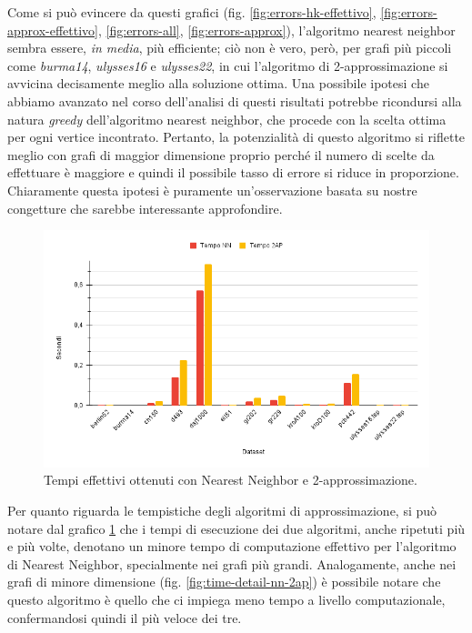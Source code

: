 Come si può evincere da questi grafici (fig. \ref{fig:errors-hk-effettivo}, \ref{fig:errors-approx-effettivo}, \ref{fig:errors-all}, \ref{fig:errors-approx}), l'algoritmo nearest neighbor sembra essere, \textit{in media}, più efficiente; ciò non è vero, però, per grafi più piccoli come \textit{burma14}, \textit{ulysses16} e \textit{ulysses22}, in cui l'algoritmo di 2-approssimazione si avvicina decisamente meglio alla soluzione ottima. 
Una possibile ipotesi che abbiamo avanzato nel corso dell'analisi di questi risultati potrebbe ricondursi alla natura \textit{greedy} dell'algoritmo nearest neighbor, che procede con la scelta ottima per ogni vertice incontrato. Pertanto, la potenzialità di questo algoritmo si riflette meglio con grafi di maggior dimensione proprio perché il numero di scelte da effettuare è maggiore e quindi il possibile tasso di errore si riduce in proporzione. Chiaramente questa ipotesi è puramente un'osservazione basata su nostre congetture che sarebbe interessante approfondire. 


\begin{figure}[H]
	\centering
	\includegraphics[width=1\textwidth]{res/images/time/time-nn-2ap.png}
	\caption{Tempi effettivi ottenuti con Nearest Neighbor e 2-approssimazione.}
	\label{fig:time-nn-2ap}
\end{figure}

Per quanto riguarda le tempistiche degli algoritmi di approssimazione, si può notare dal grafico \ref{fig:time-nn-2ap} che i tempi di esecuzione dei due algoritmi, anche ripetuti più e più volte, denotano un minore tempo di computazione effettivo per l'algoritmo di Nearest Neighbor, specialmente nei grafi più grandi. 
Analogamente, anche nei grafi di minore dimensione (fig. \ref{fig:time-detail-nn-2ap}) è possibile notare che questo algoritmo è quello che ci impiega meno tempo a livello computazionale, confermandosi quindi il più veloce dei tre. 

